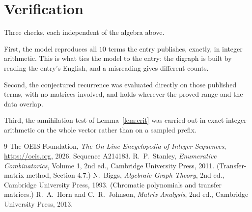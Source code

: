 \documentclass[11pt,a4paper]{article}
\theoremstyle{plain}
\theoremstyle{definition}
\begin{document}
\section{Verification}

Three checks, each independent of the algebra above.

First, the model reproduces all $10$ terms the entry publishes, exactly, in integer
arithmetic. This is what ties the model to the entry: the digraph is built by reading the
entry's English, and a misreading gives different counts.

Second, the conjectured recurrence was evaluated directly on those published terms, with no
matrices involved, and holds wherever the proved range and the data overlap.

Third, the annihilation test of Lemma~\ref{lem:crit} was carried out in exact integer
arithmetic on the whole vector rather than on a sampled prefix.

\begin{thebibliography}{9}
 The OEIS Foundation, \emph{The On-Line Encyclopedia of Integer
Sequences}, \url{https://oeis.org}, 2026. Sequence A214183.
 R.~P.~Stanley, \emph{Enumerative Combinatorics}, Volume 1, 2nd ed.,
Cambridge University Press, 2011. (Transfer-matrix method, Section 4.7.)
 N.~Biggs, \emph{Algebraic Graph Theory}, 2nd ed., Cambridge University
Press, 1993. (Chromatic polynomials and transfer matrices.)
 R.~A.~Horn and C.~R.~Johnson, \emph{Matrix Analysis}, 2nd ed., Cambridge
University Press, 2013.
\end{thebibliography}
\end{document}
